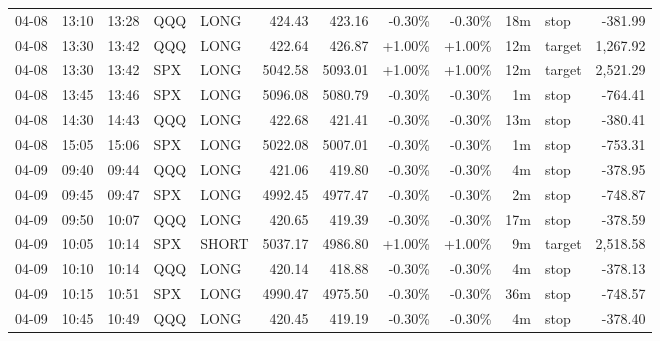 \documentclass[11pt,a4paper,twoside]{article}
\begin{document}
\begin{center}
\begin{longtable}{>{\color{txtmain}}l l l l l r r r r r >{\color{txtmain}}l r}
04-08 & 13:10 & 13:28 & QQQ & LONG & 424.43 & 423.16 & \textcolor{lossred}{-0.30\%} & \textcolor{lossred}{-0.30\%} & 18m & stop & \textcolor{lossred}{-381.99} \\
04-08 & 13:30 & 13:42 & QQQ & LONG & 422.64 & 426.87 & \textcolor{wingreen}{+1.00\%} & \textcolor{wingreen}{+1.00\%} & 12m & target & \textcolor{wingreen}{1,267.92} \\
04-08 & 13:30 & 13:42 & SPX & LONG & 5042.58 & 5093.01 & \textcolor{wingreen}{+1.00\%} & \textcolor{wingreen}{+1.00\%} & 12m & target & \textcolor{wingreen}{2,521.29} \\
04-08 & 13:45 & 13:46 & SPX & LONG & 5096.08 & 5080.79 & \textcolor{lossred}{-0.30\%} & \textcolor{lossred}{-0.30\%} & 1m & stop & \textcolor{lossred}{-764.41} \\
04-08 & 14:30 & 14:43 & QQQ & LONG & 422.68 & 421.41 & \textcolor{lossred}{-0.30\%} & \textcolor{lossred}{-0.30\%} & 13m & stop & \textcolor{lossred}{-380.41} \\
04-08 & 15:05 & 15:06 & SPX & LONG & 5022.08 & 5007.01 & \textcolor{lossred}{-0.30\%} & \textcolor{lossred}{-0.30\%} & 1m & stop & \textcolor{lossred}{-753.31} \\
04-09 & 09:40 & 09:44 & QQQ & LONG & 421.06 & 419.80 & \textcolor{lossred}{-0.30\%} & \textcolor{lossred}{-0.30\%} & 4m & stop & \textcolor{lossred}{-378.95} \\
04-09 & 09:45 & 09:47 & SPX & LONG & 4992.45 & 4977.47 & \textcolor{lossred}{-0.30\%} & \textcolor{lossred}{-0.30\%} & 2m & stop & \textcolor{lossred}{-748.87} \\
04-09 & 09:50 & 10:07 & QQQ & LONG & 420.65 & 419.39 & \textcolor{lossred}{-0.30\%} & \textcolor{lossred}{-0.30\%} & 17m & stop & \textcolor{lossred}{-378.59} \\
04-09 & 10:05 & 10:14 & SPX & SHORT & 5037.17 & 4986.80 & \textcolor{wingreen}{+1.00\%} & \textcolor{wingreen}{+1.00\%} & 9m & target & \textcolor{wingreen}{2,518.58} \\
04-09 & 10:10 & 10:14 & QQQ & LONG & 420.14 & 418.88 & \textcolor{lossred}{-0.30\%} & \textcolor{lossred}{-0.30\%} & 4m & stop & \textcolor{lossred}{-378.13} \\
04-09 & 10:15 & 10:51 & SPX & LONG & 4990.47 & 4975.50 & \textcolor{lossred}{-0.30\%} & \textcolor{lossred}{-0.30\%} & 36m & stop & \textcolor{lossred}{-748.57} \\
04-09 & 10:45 & 10:49 & QQQ & LONG & 420.45 & 419.19 & \textcolor{lossred}{-0.30\%} & \textcolor{lossred}{-0.30\%} & 4m & stop & \textcolor{lossred}{-378.40} \\

\end{longtable}
\end{center}
\end{document}
